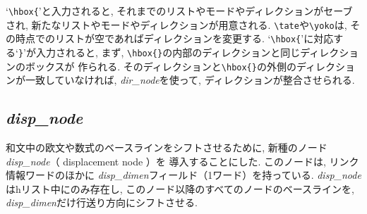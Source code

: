 `\verb|\hbox{|'と入力されると,
それまでのリストやモードやディレクションがセーブされ,
新たなリストやモードやディレクションが用意される.
\verb|\tate|や\verb|\yoko|は,
その時点でのリストが空であればディレクションを変更する.
`\verb|\hbox{|'に対応する`\verb|}|'が入力されると,
まず, \verb|\hbox{}|の内部のディレクションと同じディレクションのボックスが
作られる.
そのディレクションと\verb|\hbox{}|の外側のディレクションが一致していなければ,
{\it dir\_node}を使って, ディレクションが整合させられる.

\subsection{\it disp\_node}

和文中の欧文や数式のベースラインをシフトさせるために,
新種のノード{\it disp\_node\/}（\kern0pt displacement node\kern0pt ）を
導入することにした.
このノードは, リンク情報ワードのほかに
{\it disp\_dimen\/}フィールド（1ワード）を持っている.
{\it disp\_node\/}はhリスト中にのみ存在し,
このノード以降のすべてのノードのベースラインを,
{\it disp\_dimen}だけ行送り方向にシフトさせる.

